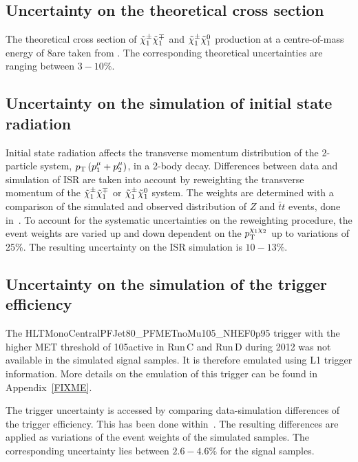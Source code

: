 \subsection*{Uncertainty on the theoretical cross section}
The theoretical cross section of $\tilde{\chi}^{\pm}_{1}\tilde{\chi}^{\mp}_{1}$ and $\tilde{\chi}^{\pm}_{1}\tilde{\chi}^{0}_{1}$ production at a centre-of-mass energy of 8\tev are taken from \cite{bib:SignalCrossSection_2012,bib:SignalCrossSection_2013}.
The corresponding theoretical uncertainties are ranging between $3-10\%$.

\subsection*{Uncertainty on the simulation of initial state radiation}
Initial state radiation affects the transverse momentum distribution of the 2-particle system, $p_{\text{T}}\left(p_1^{\mu} + p_2^{\mu} \right)$, in a 2-body decay.
Differences between data and simulation of ISR are taken into account by reweighting the transverse momentum of the $\tilde{\chi}^{\pm}_{1}\tilde{\chi}^{\mp}_{1}$ or $\tilde{\chi}^{\pm}_{1}\tilde{\chi}^{0}_{1}$ system.
The weights are determined with a comparison of the simulated and observed \pt distribution of $Z$ and $\bar{t}t$ events, done in~\cite{bib:CMS:ISR_AN}.
To account for the systematic uncertainties on the reweighting procedure, the event weights are varied up and down dependent on the $p_{\text{T}}^{\chi_1\chi_2}$ up to variations of 25\%.
The resulting uncertainty on the ISR simulation is $10-13\%$.

\subsection*{Uncertainty on the simulation of the trigger efficiency}
The HLTMonoCentralPFJet80\_PFMETnoMu105\_NHEF0p95 trigger with the higher MET threshold of 105\gev active in Run\,C and Run\,D during 2012 was not available in the simulated signal samples.
It is therefore emulated using L1 trigger information. 
More details on the emulation of this trigger can be found in Appendix~\ref{FIXME}.

The trigger uncertainty is accessed by comparing data-simulation differences of the trigger efficiency.
This has been done within~\cite{bib:CMS:DT_Thesis,bib:CMS:DT_8TeV_AN}.
The resulting differences are applied as variations of the event weights of the simulated samples.
The corresponding uncertainty lies between $2.6-4.6\%$ for the signal samples.

